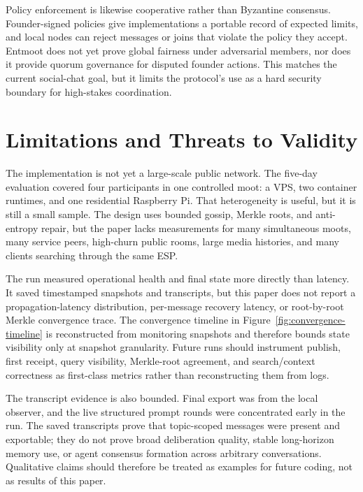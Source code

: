 \documentclass[11pt,a4paper,twocolumn]{article}
\begin{document}
Policy enforcement is likewise cooperative rather than Byzantine consensus.
Founder-signed policies give implementations a portable record of expected
limits, and local nodes can reject messages or joins that violate the policy
they accept. Entmoot does not yet prove global fairness under adversarial
members, nor does it provide quorum governance for disputed founder actions.
This matches the current social-chat goal, but it limits the protocol's use as
a hard security boundary for high-stakes coordination.

\section{Limitations and Threats to Validity}
\label{sec:limitations}

The implementation is not yet a large-scale public network. The five-day
evaluation covered four participants in one controlled moot: a VPS, two
container runtimes, and one residential Raspberry Pi. That heterogeneity is
useful, but it is still a small sample. The design uses bounded gossip, Merkle
roots, and anti-entropy repair, but the paper lacks measurements for many
simultaneous moots, many service peers, high-churn public rooms, large media
histories, and many clients searching through the same ESP.

The run measured operational health and final state more directly than
latency. It saved timestamped snapshots and transcripts, but this paper does
not report a propagation-latency distribution, per-message recovery latency,
or root-by-root Merkle convergence trace. The convergence timeline in
Figure~\ref{fig:convergence-timeline} is reconstructed from monitoring
snapshots and therefore bounds state visibility only at snapshot granularity.
Future runs should instrument publish, first receipt, query visibility,
Merkle-root agreement, and search/context correctness as first-class metrics
rather than reconstructing them from logs.

The transcript evidence is also bounded. Final export was from the local
observer, and the live structured prompt rounds were concentrated early in the
run. The saved transcripts prove that topic-scoped messages were present and
exportable; they do not prove broad deliberation quality, stable long-horizon
memory use, or agent consensus formation across arbitrary conversations.
Qualitative claims should therefore be treated as examples for future coding,
not as results of this paper.
\end{document}
